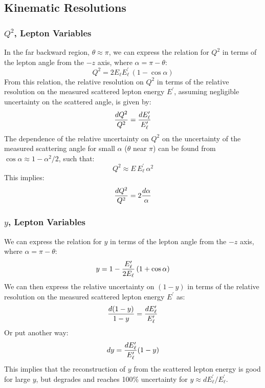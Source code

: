 \documentclass[12pt]{article}
\begin{document}
\subsection{Kinematic Resolutions}

\subsubsection{$Q^2$, Lepton Variables}

In the far backward region, $\theta \approx \pi$, we can express the relation for $Q^2$ in terms of the lepton angle from the $-z$ axis, where $\alpha = \pi - \theta$:
%
\begin{equation}
Q^2 = 2 E_\ell E^\prime_\ell\, (1- \cos \alpha)
\label{eq:Q2alpha}
\end{equation}
%
From this relation, the relative resolution on $Q^2$ in terms of the relative resolution on the measured scattered lepton energy $E^\prime$, assuming negligible uncertainty on the scattered angle, is given by:
%
\begin{equation}
  {dQ^2 \over Q^2} = {dE^\prime_{\ell} \over E^\prime_{\ell}}
\label{eq:dQ2Elep}
\end{equation}
%
The dependence of the relative uncertainty on $Q^2$ on the uncertainty of the measured scattering angle for small $\alpha$ ($\theta$ near $\pi$) can be found from $\cos\alpha \approx 1-\alpha^2/2$, such that:
%
\begin{equation}
Q^2 \approx E\,E^\prime_{\ell}\, \alpha^2
\end{equation}
This implies:
%
\begin{equation}
  {dQ^2 \over Q^2} = 2{d\alpha \over \alpha}
\label{eq:dQ2alpha}
\end{equation}
%

\subsubsection{$y$, Lepton Variables}

We can express the relation for $y$ in terms of the lepton angle from the $-z$ axis, where $\alpha = \pi - \theta$:
%
\begin{equation}
y = 1 - {E^\prime_\ell \over 2 E_\ell} \, (1+\cos\alpha)
\label{eq:Yalpha}
\end{equation}
%
We can then express the relative uncertainty on $(1-y)$ in terms of the relative resolution on the measured scattered lepton energy $E^\prime$ as:
%
\begin{equation}
{d(1-y) \over 1-y} = {dE^\prime_{\ell} \over E^\prime_{\ell}}
\end{equation}
%
Or put another way:
%
\begin{equation}
dy = {dE^\prime_{\ell} \over E^\prime_{\ell}}(1-y)
\end{equation}
%
This implies that the reconstruction of $y$ from the scattered lepton energy is good for large $y$, but degrades and reaches 100\% uncertainty for $y \approx dE^\prime_{\ell}/E^\prime_{\ell}$. 
\end{document}
